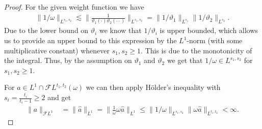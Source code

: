 \documentclass[a4paper]{article}
\newcommand{\norm}[2]{\|#1\|_{#2}}
\numberwithin{equation}{section}
\theoremstyle{remark}
\begin{document}
\begin{proof}
    For the given weight function we have
    \begin{align*}
        \norm{{1}/{\omega}}{L^{s_1,s_2}}
        \lesssim \norm{\frac{1}{\vartheta_1(\cdot)\vartheta_2(\cdot\cdot)}}{L^{s_1,s_2}}
        =\norm{{1}/{\vartheta_1}}{L^{s_1}}\norm{{1}/{\vartheta_2}}{L^{s_2}}.
    \end{align*}
    Due to the lower bound on \(\vartheta_i\) we know that \(1/\vartheta_i\) is upper bounded, which allows us to provide an upper bound to this expression by the \(L^1\)-norm (with some multiplicative constant) whenever \(s_1,s_2\geq 1\).
    This is due to the monotonicity of the integral.
    Thus, by the assumption on \(\vartheta_1\) and \(\vartheta_2\) we get that \(1/\omega\in L^{s_1,s_2}\) for \(s_1,s_2\geq 1\).
    
    For \(a\in L^1\cap\mathscr{F}L^{t_1,t_2}(\omega)\) we can then apply Hölder's inequality with \(s_i=\frac{t_i}{t_i-1}\geq 2\) and get
    \begin{align*}
        \norm{a}{\mathscr{F}L^1}
        &=\norm{\hat{a}}{L^1}
        =\norm{\frac{1}{\omega}\omega\hat{a}}{L^1}
        \leq \norm{{1}/{\omega}}{L^{s_1,s_2}}\norm{\omega\hat{a}}{L^{t_1,t_2}}
        <\infty.
    \end{align*}
\end{proof}
\end{document}
